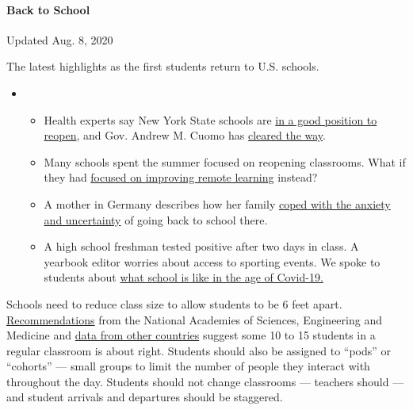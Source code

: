 \hypertarget{back-to-school}{%
\paragraph{Back to School}\label{back-to-school}}

Updated Aug. 8, 2020

The latest highlights as the first students return to U.S. schools.

\begin{itemize}
\item
  \begin{itemize}
  \tightlist
  \item
    Health experts say New York State schools are
    \href{https://www.nytimes.com/2020/08/07/health/coronavirus-ny-schools-reopen.html?action=click\&pgtype=Article\&state=default\&region=MAIN_CONTENT_2\&context=storylines_keepup}{in
    a good position to reopen}, and Gov. Andrew M. Cuomo has
    \href{https://www.nytimes.com/2020/08/07/nyregion/cuomo-schools-reopening.html?action=click\&pgtype=Article\&state=default\&region=MAIN_CONTENT_2\&context=storylines_keepup}{cleared
    the way}.
  \item
    Many schools spent the summer focused on reopening classrooms. What
    if they had
    \href{https://www.nytimes.com/2020/08/07/us/remote-learning-fall-2020.html?action=click\&pgtype=Article\&state=default\&region=MAIN_CONTENT_2\&context=storylines_keepup}{focused
    on improving remote learning} instead?
  \item
    A mother in Germany describes how her family
    \href{https://www.nytimes.com/2020/08/07/parenting/germany-schools-reopening-children.html?action=click\&pgtype=Article\&state=default\&region=MAIN_CONTENT_2\&context=storylines_keepup}{coped
    with the anxiety and uncertainty} of going back to school there.
  \item
    A high school freshman tested positive after two days in class. A
    yearbook editor worries about access to sporting events. We spoke to
    students about
    \href{https://www.nytimes.com/2020/08/06/us/coronavirus-students.html?action=click\&pgtype=Article\&state=default\&region=MAIN_CONTENT_2\&context=storylines_keepup}{what
    school is like in the age of Covid-19.}
  \end{itemize}
\end{itemize}

Schools need to reduce class size to allow students to be 6 feet apart.
\href{https://www.nationalacademies.org/news/2020/07/schools-should-prioritize-reopening-in-fall-2020-especially-for-grades-k-5-while-weighing-risks-and-benefits}{Recommendations}
from the National Academies of Sciences, Engineering and Medicine and
\href{https://www.sciencemag.org/news/2020/07/school-openings-across-globe-suggest-ways-keep-coronavirus-bay-despite-outbreaks}{data
from other countries} suggest some 10 to 15 students in a regular
classroom is about right. Students should also be assigned to ``pods''
or ``cohorts'' --- small groups to limit the number of people they
interact with throughout the day. Students should not change classrooms
--- teachers should --- and student arrivals and departures should be
staggered.

